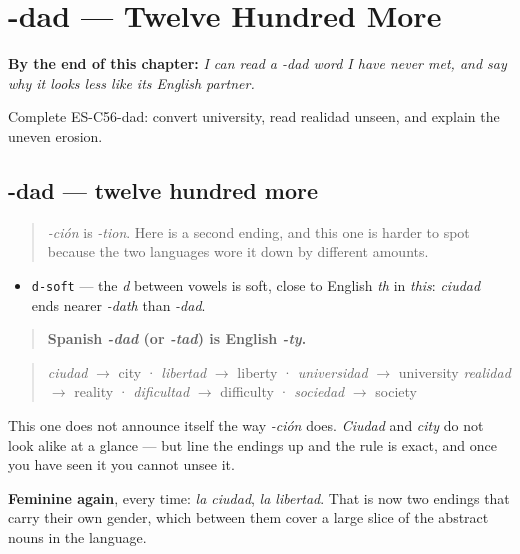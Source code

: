 
\chapter{-dad --- Twelve Hundred More}
\label{ch:friend-dad}

\begin{chapteropening}
\textbf{By the end of this chapter:} \emph{I can read a -dad word I have never met, and say why it looks less like its English partner.}

Complete ES-C56-dad: convert university, read realidad unseen, and explain the uneven erosion.
\end{chapteropening}

\section[-dad]{-dad — twelve hundred more}

\label{lesson:ES-C56-dad}



\begin{quote}
\emph{-ción} is \emph{-tion}. Here is a second ending, and this one is harder to spot because the two languages wore it down by different amounts.
\end{quote}

\begin{sounds}
\begin{itemize}
\raggedright
  \item \texttt{d-soft} — the \emph{d} between vowels is soft, close to English \emph{th} in \emph{this}: \emph{ciudad} ends nearer \emph{-dath} than \emph{-dad}.
\end{itemize}
\end{sounds}

\begin{grammarlens}[title={Grammar Lens: -dad is -ty}]
\begin{quote}
\textbf{Spanish \emph{-dad} (or \emph{-tad}) is English \emph{-ty}.}
\end{quote}

\begin{quote}
\emph{ciudad} $\to$ city · \emph{libertad} $\to$ liberty · \emph{universidad} $\to$ university \emph{realidad} $\to$ reality · \emph{dificultad} $\to$ difficulty · \emph{sociedad} $\to$ society
\end{quote}

This one does not announce itself the way \emph{-ción} does. \emph{Ciudad} and \emph{city} do not look alike at a glance — but line the endings up and the rule is exact, and once you have seen it you cannot unsee it.

\textbf{Feminine again}, every time: \emph{la ciudad}, \emph{la libertad}. That is now two endings that carry their own gender, which between them cover a large slice of the abstract nouns in the language.
\end{grammarlens}

